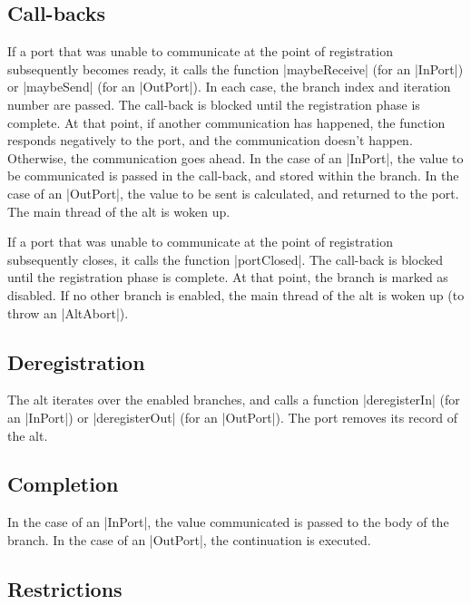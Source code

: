 \documentclass[12pt,a4paper]{article}
\begin{document}

\subsection*{Call-backs}

If a port that was unable to communicate at the point of registration
subsequently becomes ready, it calls the function |maybeReceive| (for an
|InPort|) or |maybeSend| (for an |OutPort|).  In each case, the branch index and
iteration number are passed.
%
The call-back is blocked until the registration phase is complete.  At that
point, if another communication has happened, the function responds negatively
to the port, and the communication doesn't happen.  Otherwise, the
communication goes ahead.  In the case of an |InPort|, the value to be
communicated is passed in the call-back, and stored within the branch.  In the
case of an |OutPort|, the value to be sent is calculated, and returned to the
port.  The main thread of the alt is woken up.

If a port that was unable to communicate at the point of registration
subsequently closes, it calls the function |portClosed|.  The call-back is
blocked until the registration phase is complete.  At that point, the branch
is marked as disabled.  If no other branch is enabled, the main thread of the
alt is woken up (to throw an |AltAbort|).


\subsection*{Deregistration}

The alt iterates over the enabled branches, and calls a function
|deregisterIn| (for an |InPort|) or |deregisterOut| (for an |OutPort|).  The
port removes its record of the alt.  


\subsection*{Completion}

In the case of an |InPort|, the value communicated is passed to the body of
the branch.  In the case of an |OutPort|, the continuation is executed. 


\subsection*{Restrictions}
\end{document}
